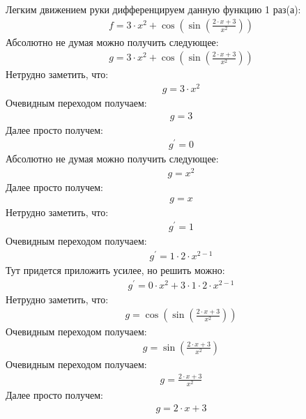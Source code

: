 \documentclass[12pt,a4paper]{scrartcl}
\begin{document}
Легким движением руки дифференцируем данную функцию 1 раз(а):
\begin{gather}\label{eq:1}f  = 3 \cdot x ^ {2} +  \cos{ \left( \sin{ \left(\frac{2 \cdot x + 3}{x ^ {2}}\right) } \right) } \end{gather}
Абсолютно не думая можно получить следующее:
\begin{gather}\label{eq:1}g  = 3 \cdot x ^ {2} +  \cos{ \left( \sin{ \left(\frac{2 \cdot x + 3}{x ^ {2}}\right) } \right) } \end{gather}
Нетрудно заметить, что:
\begin{gather}\label{eq:1}g  = 3 \cdot x ^ {2}\end{gather}
Очевидным переходом получаем:
\begin{gather}\label{eq:1}g  = 3\end{gather}
Далее просто получем:
\begin{gather}\label{eq:1}g^\prime  = 0\end{gather}
Абсолютно не думая можно получить следующее:
\begin{gather}\label{eq:1}g  = x ^ {2}\end{gather}
Далее просто получем:
\begin{gather}\label{eq:1}g  = x\end{gather}
Нетрудно заметить, что:
\begin{gather}\label{eq:1}g^\prime  = 1\end{gather}
Очевидным переходом получаем:
\begin{gather}\label{eq:1}g^\prime  = 1 \cdot 2 \cdot x ^ {2 - 1}\end{gather}
Тут придется приложить усилее, но решить можно:
\begin{gather}\label{eq:1}g^\prime  = 0 \cdot x ^ {2} + 3 \cdot 1 \cdot 2 \cdot x ^ {2 - 1}\end{gather}
Нетрудно заметить, что:
\begin{gather}\label{eq:1}g  =  \cos{ \left( \sin{ \left(\frac{2 \cdot x + 3}{x ^ {2}}\right) } \right) } \end{gather}
Очевидным переходом получаем:
\begin{gather}\label{eq:1}g  =  \sin{ \left(\frac{2 \cdot x + 3}{x ^ {2}}\right) } \end{gather}
Очевидным переходом получаем:
\begin{gather}\label{eq:1}g  = \frac{2 \cdot x + 3}{x ^ {2}}\end{gather}
Далее просто получем:
\begin{gather}\label{eq:1}g  = 2 \cdot x + 3\end{gather}
\end{document}
